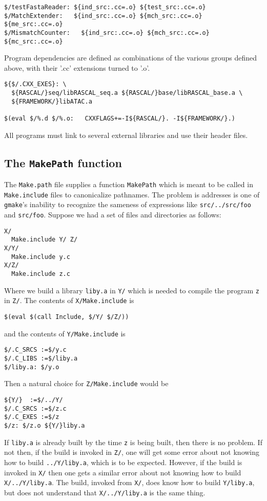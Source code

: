 \documentclass{article}
\begin{document}
\begin{verbatim}
$/testFastaReader: ${ind_src:.cc=.o} ${test_src:.cc=.o}
$/MatchExtender:   ${ind_src:.cc=.o} ${mch_src:.cc=.o} ${me_src:.cc=.o} 
$/MismatchCounter:   ${ind_src:.cc=.o} ${mch_src:.cc=.o} ${mc_src:.cc=.o} 
\end{verbatim}
Program dependencies are defined as combinations of the various
groups defined above, with their '.cc' extensions turned to '.o'.

\begin{verbatim}
${$/.CXX_EXES}: \
  ${RASCAL/}seq/libRASCAL_seq.a ${RASCAL/}base/libRASCAL_base.a \
  ${FRAMEWORK/}libATAC.a

$(eval $/%.d $/%.o:   CXXFLAGS+=-I${RASCAL/}. -I${FRAMEWORK/}.)
\end{verbatim}
All programs must link to several external libraries and use their
header files.

\subsection{The \verb+MakePath+ function}

The \verb+Make.path+ file supplies a function \verb+MakePath+ which is
meant to be called in \verb+Make.include+ files to canonicalize pathnames.
The problem is addresses is one of \verb+gmake+'s inability to recognize
the sameness of expressions like \verb+src/../src/foo+ and \verb+src/foo+.
Suppose we had a set of files and directories as follows:
\begin{verbatim}
X/
  Make.include Y/ Z/
X/Y/
  Make.include y.c
X/Z/
  Make.include z.c
\end{verbatim}
Where we build a library \verb+liby.a+ in \verb+Y/+ which is needed to
compile the program \verb+z+ in \verb+Z/+.  The contents of
\verb+X/Make.include+ is
\begin{verbatim}
$(eval $(call Include, $/Y/ $/Z/))
\end{verbatim}
and the contents of \verb+Y/Make.include+ is
\begin{verbatim}
$/.C_SRCS :=$/y.c
$/.C_LIBS :=$/liby.a
$/liby.a: $/y.o
\end{verbatim}
Then a natural choice for \verb+Z/Make.include+ would be
\begin{verbatim}
${Y/}  :=$/../Y/
$/.C_SRCS :=$/z.c
$/.C_EXES :=$/z
$/z: $/z.o ${Y/}liby.a
\end{verbatim}
If \verb+liby.a+ is already built by the time \verb+z+ is being
built, then there is no problem.  If not then, if the build
is invoked in \verb+Z/+, one will get some error about not
knowing how to build \verb+../Y/liby.a+, which is to be expected.
However, if the build is invoked in \verb+X/+ then one gets
a similar error about not knowing how to build \verb+X/../Y/liby.a+.
The build, invoked from \verb+X/+, does know how to build \verb+Y/liby.a+,
but does not understand that \verb+X/../Y/liby.a+ is the same thing.
\end{document}
